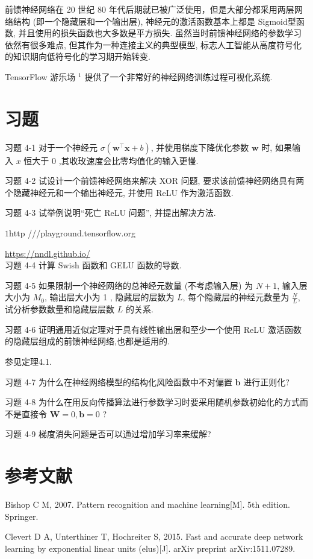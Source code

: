 \documentclass[10pt]{article}
\begin{document}
前馈神经网络在 20 世纪 80 年代后期就已被广泛使用，但是大部分都采用两层网络结构 (即一个隐藏层和一个输出层), 神经元的激活函数基本上都是 Sigmoid型函数, 并且使用的损失函数也大多数是平方损失. 虽然当时前馈神经网络的参数学习依然有很多难点, 但其作为一种连接主义的典型模型, 标志人工智能从高度符号化的知识期向低符号化的学习期开始转变.

TensorFlow 游乐场 ${ }^{1}$ 提供了一个非常好的神经网络训练过程可视化系统.

\section*{习题}
习题 4-1 对于一个神经元 $\sigma\left(\boldsymbol{w}^{\top} \boldsymbol{x}+b\right)$, 并使用梯度下降优化参数 $\boldsymbol{w}$ 时, 如果输入 $x$ 恒大于 0 ,其收玫速度会比零均值化的输入更慢.

习题 4-2 试设计一个前馈神经网络来解决 XOR 问题, 要求该前馈神经网络具有两个隐藏神经元和一个输出神经元, 并使用 ReLU 作为激活函数.

习题 4-3 试举例说明“死亡 ReLU 问题”, 并提出解决方法.

$1 \mathrm{http}$ ///playground.tensorflow.org

\href{https://nndl.github.io/}{https://nndl.github.io/}\\
习题 4-4 计算 Swish 函数和 GELU 函数的导数.

习题 4-5 如果限制一个神经网络的总神经元数量 (不考虑输入层) 为 $N+1$, 输入层大小为 $M_{0}$, 输出层大小为 1 , 隐藏层的层数为 $L$, 每个隐藏层的神经元数量为 $\frac{N}{L}$, 试分析参数数量和隐藏层层数 $L$ 的关系.

习题 4-6 证明通用近似定理对于具有线性输出层和至少一个使用 ReLU 激活函数的隐藏层组成的前馈神经网络,也都是适用的.

参见定理4.1.

习题 4-7 为什么在神经网络模型的结构化风险函数中不对偏置 $\boldsymbol{b}$ 进行正则化?

习题 4-8 为什么在用反向传播算法进行参数学习时要采用随机参数初始化的方式而不是直接令 $\boldsymbol{W}=0, \boldsymbol{b}=0$ ?

习题 4-9 梯度消失问题是否可以通过增加学习率来缓解?

\section*{参考文献}
Bishop C M, 2007. Pattern recognition and machine learning[M]. 5th edition. Springer.

Clevert D A, Unterthiner T, Hochreiter S, 2015. Fast and accurate deep network learning by exponential linear units (elus)[J]. arXiv preprint arXiv:1511.07289.
\end{document}
